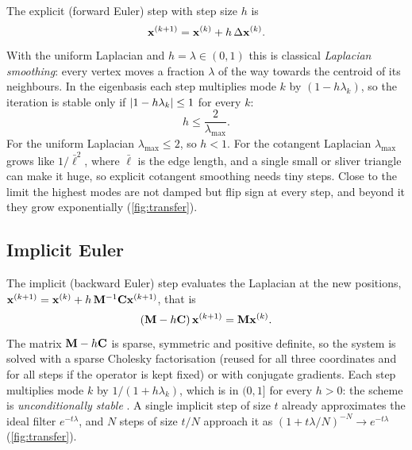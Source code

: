 The explicit (forward Euler) step with step size $h$ is
\begin{equation}
\mathbf{x}^{(k+1)}=\mathbf{x}^{(k)}+h\,\Delta\mathbf{x}^{(k)} .
\end{equation}
With the uniform Laplacian and $h=\lambda\in(0,1)$ this is classical \emph{Laplacian smoothing}:
every vertex moves a fraction $\lambda$ of the way towards the centroid of its neighbours. In the
eigenbasis each step multiplies mode $k$ by $(1-h\lambda_k)$, so the iteration is stable only if
$\left\lvert 1-h\lambda_k\right\rvert\le1$ for every $k$:
\begin{equation}
h\le\frac{2}{\lambda_{\max}} .
\end{equation}
For the uniform Laplacian $\lambda_{\max}\le2$, so $h<1$. For the cotangent Laplacian $\lambda_{\max}$
grows like $1/\bar\ell^2$, where $\bar\ell$ is the edge length, and a single small or sliver triangle
can make it huge, so explicit cotangent smoothing needs tiny steps. Close to the limit the highest
modes are not damped but flip sign at every step, and beyond it they grow exponentially
(\cref{fig:transfer}).

\subsection{Implicit Euler}

The implicit (backward Euler) step evaluates the Laplacian at the new positions,
$\mathbf{x}^{(k+1)}=\mathbf{x}^{(k)}+h\,\mathbf{M}^{-1}\mathbf{C}\mathbf{x}^{(k+1)}$, that is
\begin{equation}
(\mathbf{M}-h\mathbf{C})\,\mathbf{x}^{(k+1)}=\mathbf{M}\mathbf{x}^{(k)} .
\label{eq:implicit}
\end{equation}
The matrix $\mathbf{M}-h\mathbf{C}$ is sparse, symmetric and positive definite, so the system is solved with a
sparse Cholesky factorisation (reused for all three coordinates and for all steps if the operator is
kept fixed) or with conjugate gradients. Each step multiplies mode $k$ by $1/(1+h\lambda_k)$, which
is in $(0,1]$ for every $h>0$: the scheme is \emph{unconditionally stable} \citep{Desbrun1999}. A
single implicit step of size $t$ already approximates the ideal filter $e^{-t\lambda}$, and $N$
steps of size $t/N$ approach it as $(1+t\lambda/N)^{-N}\to e^{-t\lambda}$
(\cref{fig:transfer}).


